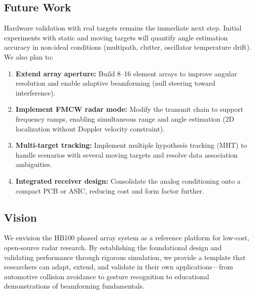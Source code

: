 \documentclass[10pt,a4paper]{article}
\begin{document}
\subsection{Future Work}

Hardware validation with real targets remains the immediate next step. Initial experiments with
static and moving targets will quantify angle estimation accuracy in non-ideal conditions
(multipath, clutter, oscillator temperature drift). We also plan to:

\begin{enumerate}
\item \textbf{Extend array aperture:} Build 8--16 element arrays to improve angular resolution and enable
  adaptive beamforming (null steering toward interference).

\item \textbf{Implement FMCW radar mode:} Modify the transmit chain to support frequency ramps, enabling
  simultaneous range and angle estimation (2D localization without Doppler velocity constraint).

\item \textbf{Multi-target tracking:} Implement multiple hypothesis tracking (MHT) to handle scenarios with
  several moving targets and resolve data association ambiguities.

\item \textbf{Integrated receiver design:} Consolidate the analog conditioning onto a compact PCB or ASIC,
  reducing cost and form factor further.
\end{enumerate}

\subsection{Vision}

We envision the HB100 phased array system as a reference platform for low-cost, open-source radar research.
By establishing the foundational design and validating performance through rigorous simulation,
we provide a template that researchers can adapt, extend, and validate in their own applications---from
automotive collision avoidance to gesture recognition to educational demonstrations of beamforming fundamentals.



\end{document}
